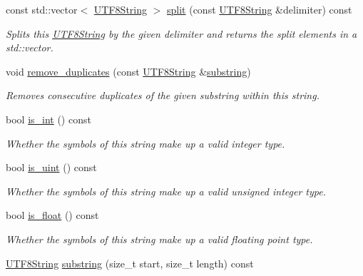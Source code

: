 \begin{DoxyCompactItemize}
const std\-::vector$<$ \hyperlink{classchaos_1_1uni_1_1_u_t_f8_string}{U\-T\-F8\-String} $>$ \hyperlink{classchaos_1_1uni_1_1_u_t_f8_string_a7d9a171234e75c018c2a0824f77222e7}{split} (const \hyperlink{classchaos_1_1uni_1_1_u_t_f8_string}{U\-T\-F8\-String} \&delimiter) const 
\begin{DoxyCompactList}\small\item\em Splits this \hyperlink{classchaos_1_1uni_1_1_u_t_f8_string}{U\-T\-F8\-String} by the given delimiter and returns the split elements in a std\-::vector. \end{DoxyCompactList}\item 
void \hyperlink{classchaos_1_1uni_1_1_u_t_f8_string_a940e7ccc70fe1d6c486a5a89941dd2ef}{remove\-\_\-duplicates} (const \hyperlink{classchaos_1_1uni_1_1_u_t_f8_string}{U\-T\-F8\-String} \&\hyperlink{classchaos_1_1uni_1_1_u_t_f8_string_abfc2bac44a9be97d0d27e7b245a7df6e}{substring})
\begin{DoxyCompactList}\small\item\em Removes consecutive duplicates of the given substring within this string. \end{DoxyCompactList}\item 
bool \hyperlink{classchaos_1_1uni_1_1_u_t_f8_string_a758102d22056ad004660c49104526642}{is\-\_\-int} () const 
\begin{DoxyCompactList}\small\item\em Whether the symbols of this string make up a valid integer type. \end{DoxyCompactList}\item 
bool \hyperlink{classchaos_1_1uni_1_1_u_t_f8_string_a0df001bc19b6ee2a9e843f88b82dbfe1}{is\-\_\-uint} () const 
\begin{DoxyCompactList}\small\item\em Whether the symbols of this string make up a valid unsigned integer type. \end{DoxyCompactList}\item 
bool \hyperlink{classchaos_1_1uni_1_1_u_t_f8_string_abc0b60f3ca6eff7782dc0e6a363ca919}{is\-\_\-float} () const 
\begin{DoxyCompactList}\small\item\em Whether the symbols of this string make up a valid floating point type. \end{DoxyCompactList}\item 
\hyperlink{classchaos_1_1uni_1_1_u_t_f8_string}{U\-T\-F8\-String} \hyperlink{classchaos_1_1uni_1_1_u_t_f8_string_abfc2bac44a9be97d0d27e7b245a7df6e}{substring} (size\-\_\-t start, size\-\_\-t length) const 

\end{DoxyCompactItemize}
